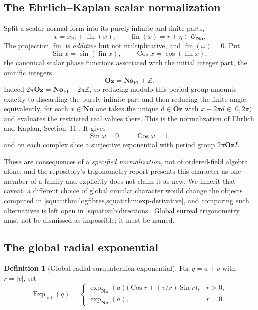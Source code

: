 \documentclass[11pt,letterpaper]{article}
\numberwithin{equation}{section}
\theoremstyle{definition}
\newtheorem{definition}[definition]{Definition}
\theoremstyle{remark}
\newcommand{\No}{\mathbf{No}}
\newcommand{\Z}{\mathbb Z}
\newcommand{\OO}{\mathcal O}
\newcommand{\Oz}{\mathbf{Oz}}
\newcommand{\fin}{\operatorname{fin}}
\newcommand{\Exp}{\operatorname{Exp}}
\newcommand{\Expr}{\Exp_{\mathrm{rad}}}
\newcommand{\Sin}{\operatorname{Sin}}
\newcommand{\Cos}{\operatorname{Cos}}
\newcommand{\abs}[1]{\left|#1\right|}
\begin{document}
\subsection{The Ehrlich--Kaplan scalar normalization}\label{squat:sub:ekphase}
Split a scalar normal form into its purely infinite and finite parts,
\[
 x=x_{\mathrm{PI}}+\fin(x),\qquad \fin(x)=r+\eta\in\OO_{\No}.
\]
The projection $\fin$ is \emph{additive} but not multiplicative, and $\fin(\omega)=0$. Put
\begin{equation}\label{squat:eq:global-phase}
 \Sin x=\sin(\fin x),\qquad \Cos x=\cos(\fin x),
\end{equation}
the canonical scalar phase functions associated with the initial integer part, the omnific
integers
\[
 \Oz=\No_{\mathrm{PI}}+\Z .
\]
Indeed $2\pi\Oz=\No_{\mathrm{PI}}+2\pi\Z$, so reducing modulo this period group amounts
exactly to discarding the purely infinite part and then reducing the finite angle;
equivalently, for each $x\in\No$ one takes the unique $d\in\Oz$ with
$x-2\pi d\in[0,2\pi)$ and evaluates the restricted real values there. This is the
normalization of Ehrlich and Kaplan, Section~11 \cite{EK}. It gives
\begin{equation}\label{squat:eq:omegaphase}
 \Sin\omega=0,\qquad \Cos\omega=1 ,
\end{equation}
and on each complex slice a surjective exponential with period group $2\pi\Oz I$.

These are consequences of a \emph{specified normalization}, not of ordered-field algebra
alone, and the repository's trigonometry report \cite{RepoTrig} presents this character as
one member of a family and explicitly does not claim it as new. We inherit that caveat: a
different choice of global circular character would change the objects computed in
\cref{squat:thm:logfibres,squat:thm:exp-derivative}, and comparing such alternatives is
left open in \cref{squat:sub:directions}. Global surreal trigonometry must not be dismissed
as impossible; it must be named.

\subsection{The global radial exponential}\label{squat:sub:radial}

\begin{definition}[Global radial surquaternion exponential]\label{squat:def:globalexp}
For $q=a+v$ with $r=\abs v$, set
\begin{equation}\label{squat:eq:globalexp}
 \Expr(q)=
 \begin{cases}
 \exp_{\No}(a)\bigl(\Cos r+(v/r)\Sin r\bigr),&r>0,\\
 \exp_{\No}(a),&r=0 .
 \end{cases}
\end{equation}
\end{definition}
\end{document}
